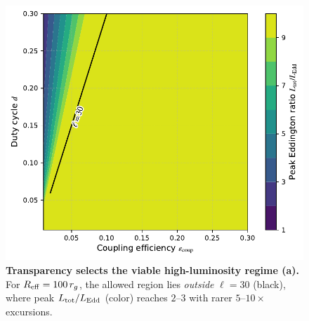 \documentclass[twocolumn]{aastex701}
\newcommand{\ellcrit}{30}
\begin{document}
\begingroup
\setlength{\textfloatsep}{6pt plus 2pt minus 2pt} %
\begin{figure}[tp!]
  \centering
  \includegraphics[width=0.95\columnwidth,trim=0 6 0 4,clip]{fig10a_Reff100.pdf}
  \vspace{-2pt}
  \caption{\textbf{Transparency selects the viable high-luminosity regime (a).}
  For $R_{\rm eff}=100\,r_g$, the allowed region lies \emph{outside} $\ell{=}\ellcrit$ (black), where peak $L_{\rm tot}/L_{\rm Edd}$ (color) reaches $2$--$3$ with rarer $5$--$10\times$ excursions.}
  \label{fig:param-a}
\end{figure}
\endgroup
\end{document}
